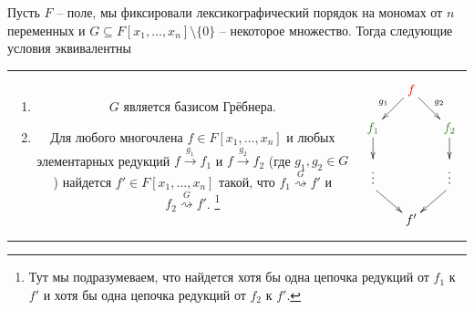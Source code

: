 \begin{claim}
\label{claim::DiamondLemma}
Пусть $F$ -- поле, мы фиксировали лексикографический порядок на мономах от $n$ переменных и $G\subseteq F[x_1,\ldots,x_n]\setminus\{0\}$ -- некоторое множество.
Тогда следующие условия эквивалентны

\begin{tabular}{cc}
{
\parbox{12cm}{
\begin{enumerate}
\item $G$ является базисом Грёбнера.

\item Для любого многочлена $f\in F[x_1,\ldots,x_n]$ и любых элементарных редукций $f\stackrel{g_1}{\longrightarrow}f_1$ и $f\stackrel{g_2}{\longrightarrow}f_2$ (где $g_1,g_2\in G$) найдется $f'\in F[x_1,\ldots,x_n]$ такой, что $f_1\stackrel{G}{\rightsquigarrow}f'$ и $f_2\stackrel{G}{\rightsquigarrow}f'$.%
\footnote{Тут мы подразумеваем, что найдется хотя бы одна цепочка редукций от $f_1$ к $f'$ и хотя бы одна цепочка редукций от $f_2$ к $f'$.}
\end{enumerate}
}}&{
\parbox{4cm}{
\[
\xymatrix@R=15pt@C=15pt{
	{}&{\textcolor{red}{f}}\ar[dl]_{g_1}\ar[dr]^{g_2}&{}\\
	{\textcolor{OliveGreen}{f_1}}\ar[d]&{}&{\textcolor{OliveGreen}{f_2}}\ar[d]\\
	{}\ar@{}[d]|{\vdots}&{}&{}\ar@{}[d]|{\vdots}\\
	{}\ar[dr]&{}&{}\ar[dl]\\
	{}&{f'}&{}\\
}
\]
}
}
\end{tabular}
\end{claim}
